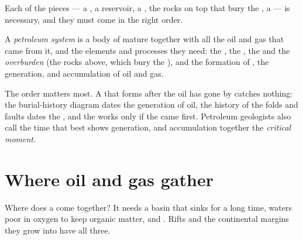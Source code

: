 Each of the pieces --- a , a reservoir, a , the rocks on top
that bury the , a  --- is necessary, and they must come in the
right order.

\begin{definition}\label{def:g11:fossil-fuel-geology:petroleum-system}
A \emph{petroleum system} is a body of mature  together with all the oil and gas that came from it, and the elements
and processes they need: the , the , the  and
the \emph{overburden} (the rocks above, which bury the
), and the formation of , the generation,  and
accumulation of oil and gas.
\end{definition}

The order matters most. A  that forms after the oil has gone by catches
nothing: the burial-history diagram dates the generation of oil, the history
of the folds and faults dates the , and the  works only
if the  came first. Petroleum geologists also call the time that best
shows generation,  and accumulation together the \emph{critical
moment}.

\section{Where oil and gas gather}

Where does a  come together? It needs a basin that sinks for
a long time, waters poor in oxygen to keep organic matter, and . Rifts
and the continental margins they grow into have all three.

